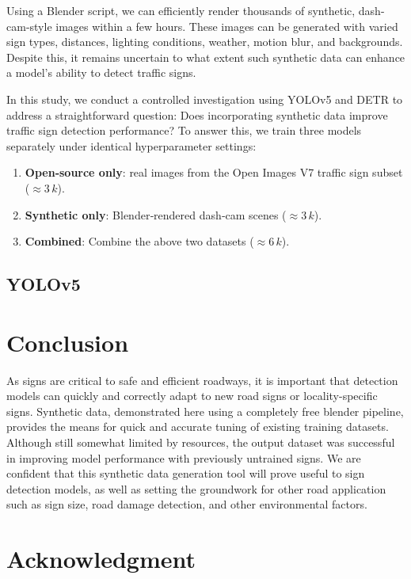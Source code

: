 \documentclass[journal]{IEEEtran}
\begin{document}
Using a Blender script, we can efficiently render thousands of synthetic, dash-cam-style images within a few hours. These images can be generated with varied sign types, distances, lighting conditions, weather, motion blur, and backgrounds. Despite this, it remains uncertain to what extent such synthetic data can enhance a model’s ability to detect traffic signs.

In this study, we conduct a controlled investigation using YOLOv5 and DETR to address a straightforward question: Does incorporating synthetic data improve traffic sign detection performance? To answer this, we train three models separately under identical hyperparameter settings:

\begin{enumerate}
  \item \textbf{Open‑source only}: real images from the Open Images V7 traffic sign subset ($\approx3\,k$).
  \item \textbf{Synthetic only}: Blender‑rendered dash‑cam scenes ($\approx3\,k$).
  \item \textbf{Combined}: Combine the above two datasets ($\approx6\,k$).
\end{enumerate}

\subsection{YOLOv5}

\section{Conclusion}
As signs are critical to safe and efficient roadways, it is important that detection models can quickly and correctly adapt to new road signs or locality-specific signs. Synthetic data, demonstrated here using a completely free blender pipeline, provides the means for quick and accurate tuning of existing training datasets. Although still somewhat limited by resources, the output dataset was successful in improving model performance with previously untrained signs. We are confident that this synthetic data generation tool will prove useful to sign detection models, as well as setting the groundwork for other road application such as sign size, road damage detection, and other environmental factors. 



\section*{Acknowledgment}
\end{document}
